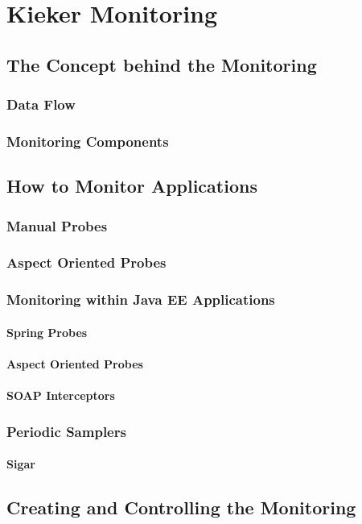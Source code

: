 \chapter{Kieker Monitoring}\label{chp:Kieker-Monitoring}
	\section{The Concept behind the Monitoring}
		\subsection{Data Flow}
		\subsection{Monitoring Components}
	\section{How to Monitor Applications}
		\subsection{Manual Probes}
		\subsection{Aspect Oriented Probes}
		\subsection{Monitoring within Java EE Applications}
			\subsubsection{Spring Probes}
			\subsubsection{Aspect Oriented Probes}
			\subsubsection{SOAP Interceptors}
		\subsection{Periodic Samplers}
			\subsubsection{Sigar}
	\section{Creating and Controlling the Monitoring}
